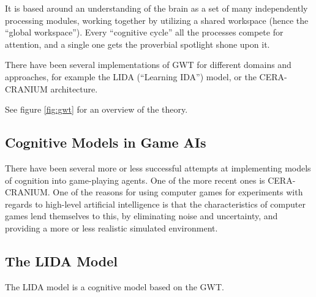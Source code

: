 It is based around an understanding of the brain as a set of many independently
processing modules, working together by utilizing a shared workspace (hence the
``global workspace''). Every ``cognitive cycle'' all the
processes compete for attention, and a single one gets the
proverbial spotlight shone upon it.\cite{baars2005gwt}

There have been several implementations of GWT for different domains and
approaches, for example the LIDA (``Learning IDA'')
model\cite{franklin2007lida}, or the CERA-CRANIUM
architecture\cite{arrabales2009ceracranium}.

See figure \ref{fig:gwt} for an overview of the theory.

\subsection{Cognitive Models in Game AIs}
There have been several more or less successful attempts at implementing models
of cognition into game-playing agents. One of the more recent ones is
CERA-CRANIUM. One of the reasons for using computer games for experiments with regards to
high-level artificial intelligence is that the characteristics of computer
games lend themselves to this, by eliminating noise and uncertainty, and
providing a more or less realistic simulated environment.

\subsection{The LIDA Model}
The LIDA model is a cognitive model based on the GWT.